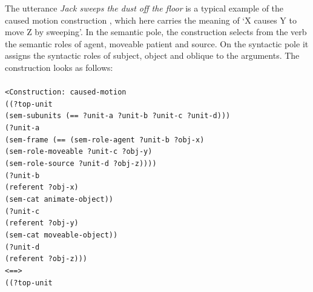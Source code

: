The utterance {\em Jack sweeps the dust off the floor} is a typical example of the caused motion construction \citep[chapter 7]{goldberg95construction}, which here carries the meaning of `X causes Y to move Z by sweeping'. In the semantic pole, the construction selects from the verb the semantic roles of agent, moveable patient and source. On the syntactic pole it assigns the syntactic roles of subject, object and oblique to the arguments. The construction looks as follows:
\\
\\
{\footnotesize{\tt <Construction: caused-motion
\\ ((?top-unit
\\ \hspace*{5mm} (sem-subunits (== ?unit-a ?unit-b ?unit-c ?unit-d)))
\\ \hspace*{2mm}(?unit-a
\\ \hspace*{5mm} (sem-frame (== (sem-role-agent ?unit-b ?obj-x)
\\ \hspace*{36mm}(sem-role-moveable ?unit-c ?obj-y)
\\ \hspace*{36mm}(sem-role-source ?unit-d ?obj-z))))
\\ \hspace*{2mm}(?unit-b
\\ \hspace*{5mm} (referent ?obj-x)
\\ \hspace*{5mm} (sem-cat animate-object))
\\ \hspace*{2mm}(?unit-c
\\ \hspace*{5mm} (referent ?obj-y)
\\ \hspace*{5mm} (sem-cat moveable-object))
\\ \hspace*{2mm}(?unit-d
\\ \hspace*{5mm} (referent ?obj-z)))
\\ <==>
\\ ((?top-unit
}}
